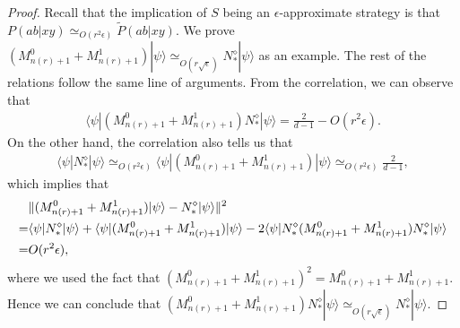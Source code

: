 \documentclass[11pt,letterpaper]{article}
\newcommand{\ket}[1]{|#1\rangle}
\newcommand{\bra}[1]{\langle#1|}
\DeclarePairedDelimiter{\norm}{\lVert}{\rVert}
\newcommand{\1}{\mathbb{1}}
\newcommand{\nr}{n(r)}
\newcommand{\pr}[2]{P(#1|#2)}
\newcommand{\tpr}[2]{\tilde{P}(#1|#2)}
\newcommand{\ep}{\epsilon}
\newcommand{\se}{\sqrt{\epsilon}}
\newcommand{\appd}[1]{\simeq_{#1}}
\theoremstyle{definition}
\begin{document}
\begin{proof} 
Recall that the implication of $S$ being an $\ep$-approximate strategy is that 
$\pr{ab}{xy} \appd{O(r^2\ep)} \tpr{ab}{xy}$. 
We prove $(M_{\nr+1}^0+M_{\nr+1}^1)\ket{\psi} \appd{O(r\se)} N_\ast^\diamond \ket{\psi}$ as an example.
The rest of the relations follow the same line of arguments.
From the correlation, we can observe that
\begin{align*}
 \bra{\psi} (M_{\nr+1}^0+M_{\nr+1}^1)N_\ast^\diamond \ket{\psi} = \frac{2}{d-1} - O(r^2 \epsilon).
\end{align*}
On the other hand, the correlation also tells us that 
\begin{align*}
	\bra{\psi} N_\ast^\diamond \ket{\psi} \appd{O(r^2\epsilon)} 
 \bra{\psi}(M_{\nr+1}^0+M_{\nr+1}^1)\ket{\psi} \appd{O(r^2\epsilon)} \frac{2}{d-1},
\end{align*}
which implies that 
\begin{align*}
	&\norm{(M_{\nr+1}^0 + M_{\nr+1}^1) \ket{\psi} - N_\ast^\diamond\ket{\psi}}^2 \\
	= &\bra{\psi} N_\ast^\diamond \ket{\psi}+\bra{\psi}(M_{\nr+1}^0+M_{\nr+1}^1)\ket{\psi} - 2\bra{\psi}N_\ast^\diamond(M_{\nr+1}^0 + M_{\nr+1}^1)N_\ast^\diamond \ket{\psi}\\
	= &O(r^2 \epsilon),
\end{align*}
where we used the fact that $(M_{\nr+1}^0 + M_{\nr+1}^1)^2 = M_{\nr+1}^0 + M_{\nr+1}^1$.
Hence we can conclude that $(M_{\nr+1}^0 + M_{\nr+1}^1)N_\ast^\diamond \ket{\psi} \appd{O(r\se)} N_\ast^\diamond\ket{\psi}$.
\end{proof}
\end{document}
